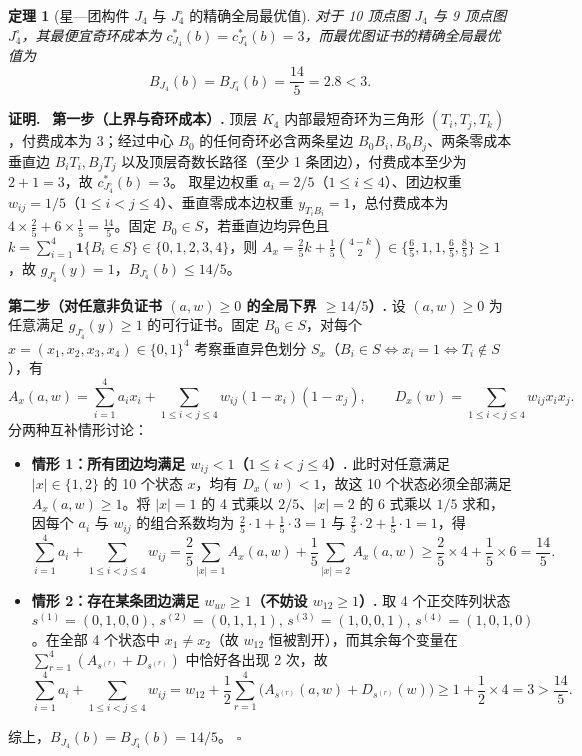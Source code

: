 \documentclass[11pt,a4paper]{ctexart}
\newtheorem{theorem}{定理}[section]
\theoremstyle{definition}
\newenvironment{proofcn}{\par\noindent\textbf{证明.}\ }{\hfill$\square$\par}
\newcommand{\1}{\boldsymbol 1}
\newcommand{\0}{\boldsymbol 0}
\begin{document}
\begin{theorem}[星—团构件 $J_4$ 与 $J_4^\circ$ 的精确全局最优值]\label{thm:J4_exact}
对于 10 顶点图 $J_4$ 与 9 顶点图 $J_4^\circ$，其最便宜奇环成本为 $c_{J_4}^*(b)=c_{J_4^\circ}^*(b)=3$，而最优图证书的精确全局最优值为
\begin{equation}\label{eq:J4_val}
 \boxed{B_{J_4}(b)=B_{J_4^\circ}(b)=\frac{14}{5}=2.8<3.}
\end{equation}
\end{theorem}
\begin{proofcn}
\textbf{第一步（上界与奇环成本）.}
顶层 $K_4$ 内部最短奇环为三角形 $(T_i,T_j,T_k)$，付费成本为 $3$；经过中心 $B_0$ 的任何奇环必含两条星边 $B_0B_i,B_0B_j$、两条零成本垂直边 $B_iT_i,B_jT_j$ 以及顶层奇数长路径（至少 1 条团边），付费成本至少为 $2+1=3$，故 $c_{J_4^\circ}^*(b)=3$。
取星边权重 $a_i=2/5$（$1\le i\le 4$）、团边权重 $w_{ij}=1/5$（$1\le i<j\le 4$）、垂直零成本边权重 $y_{T_iB_i}=1$，总付费成本为 $4\times\frac{2}{5}+6\times\frac{1}{5}=\frac{14}{5}$。固定 $B_0\in S$，若垂直边均异色且 $k=\sum_{i=1}^4 \1\{B_i\in S\}\in\{0,1,2,3,4\}$，则 $A_x=\frac{2}{5}k+\frac{1}{5}\binom{4-k}{2}\in\{\frac{6}{5},1,1,\frac{6}{5},\frac{8}{5}\}\ge 1$，故 $g_{J_4^\circ}(y)=1$，$B_{J_4^\circ}(b)\le 14/5$。

\medskip
\noindent\textbf{第二步（对任意非负证书 $(a,w)\ge 0$ 的全局下界 $\ge 14/5$）.}
设 $(a,w)\ge 0$ 为任意满足 $g_{J_4^\circ}(y)\ge 1$ 的可行证书。固定 $B_0\in S$，对每个 $x=(x_1,x_2,x_3,x_4)\in\{0,1\}^4$ 考察垂直异色划分 $S_x$（$B_i\in S\iff x_i=1\iff T_i\notin S$），有
\begin{equation}\label{eq:J4_AD}
 A_x(a,w)=\sum_{i=1}^4 a_i x_i + \sum_{1\le i<j\le 4} w_{ij}(1-x_i)(1-x_j),\qquad
 D_x(w)=\sum_{1\le i<j\le 4} w_{ij} x_i x_j.
\end{equation}
分两种互补情形讨论：
\begin{itemize}
\item \textbf{情形 1：所有团边均满足 $w_{ij}<1$（$1\le i<j\le 4$）.}
此时对任意满足 $|x|\in\{1,2\}$ 的 10 个状态 $x$，均有 $D_x(w)<1$，故这 10 个状态必须全部满足 $A_x(a,w)\ge 1$。将 $|x|=1$ 的 4 式乘以 $2/5$、$|x|=2$ 的 6 式乘以 $1/5$ 求和，因每个 $a_i$ 与 $w_{ij}$ 的组合系数均为 $\frac{2}{5}\cdot 1+\frac{1}{5}\cdot 3=1$ 与 $\frac{2}{5}\cdot 2+\frac{1}{5}\cdot 1=1$，得
\[
 \sum_{i=1}^4 a_i + \sum_{1\le i<j\le 4} w_{ij}
 = \frac{2}{5}\sum_{|x|=1} A_x(a,w) + \frac{1}{5}\sum_{|x|=2} A_x(a,w)
 \ge \frac{2}{5}\times 4 + \frac{1}{5}\times 6 = \frac{14}{5}.
\]
\item \textbf{情形 2：存在某条团边满足 $w_{uv}\ge 1$（不妨设 $w_{12}\ge 1$）.}
取 4 个正交阵列状态 $s^{(1)}=(0,1,0,0),\, s^{(2)}=(0,1,1,1),\, s^{(3)}=(1,0,0,1),\, s^{(4)}=(1,0,1,0)$。在全部 4 个状态中 $x_1\neq x_2$（故 $w_{12}$ 恒被割开），而其余每个变量在 $\sum_{r=1}^4(A_{s^{(r)}}+D_{s^{(r)}})$ 中恰好各出现 2 次，故
\[
 \sum_{i=1}^4 a_i + \sum_{1\le i<j\le 4} w_{ij}
 = w_{12} + \frac{1}{2}\sum_{r=1}^4\bigl(A_{s^{(r)}}(a,w)+D_{s^{(r)}}(w)\bigr)
 \ge 1 + \frac{1}{2}\times 4 = 3 > \frac{14}{5}.
\]
\end{itemize}
综上，$B_{J_4}(b)=B_{J_4^\circ}(b)=14/5$。
\end{proofcn}
\end{document}
